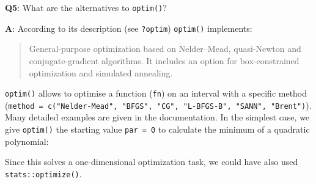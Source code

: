 \documentclass[
]{krantz}
\makeatletter
\newenvironment{Shaded}{\begin{snugshade}}{\end{snugshade}}
\newcommand{\CommentTok}[1]{\textcolor[rgb]{0.56,0.35,0.01}{\textit{#1}}}
\newcommand{\ControlFlowTok}[1]{\textcolor[rgb]{0.13,0.29,0.53}{\textbf{#1}}}
\newcommand{\DataTypeTok}[1]{\textcolor[rgb]{0.13,0.29,0.53}{#1}}
\newcommand{\DecValTok}[1]{\textcolor[rgb]{0.00,0.00,0.81}{#1}}
\newcommand{\FloatTok}[1]{\textcolor[rgb]{0.00,0.00,0.81}{#1}}
\newcommand{\KeywordTok}[1]{\textcolor[rgb]{0.13,0.29,0.53}{\textbf{#1}}}
\newcommand{\NormalTok}[1]{#1}
\newcommand{\OperatorTok}[1]{\textcolor[rgb]{0.81,0.36,0.00}{\textbf{#1}}}
\newcommand{\StringTok}[1]{\textcolor[rgb]{0.31,0.60,0.02}{#1}}
\newenvironment{kframe}{%
\medskip{}
\setlength{\fboxsep}{.8em}
 \def\at@end@of@kframe{}%
 \ifinner\ifhmode%
  \def\at@end@of@kframe{\end{minipage}}%
  \begin{minipage}{\columnwidth}%
 \fi\fi%
 \def\FrameCommand##1{\hskip\@totalleftmargin \hskip-\fboxsep
 \colorbox{shadecolor}{##1}\hskip-\fboxsep
     \hskip-\linewidth \hskip-\@totalleftmargin \hskip\columnwidth}%
 \MakeFramed {\advance\hsize-\width
   \@totalleftmargin\z@ \linewidth\hsize
   \@setminipage}}%
 {\par\unskip\endMakeFramed%
 \at@end@of@kframe}
\renewenvironment{Shaded}{\begin{kframe}}{\end{kframe}}
\renewcommand{\KeywordTok} [1]{\textcolor[rgb]{0.00,0.44,0.13}{{#1}}}
\renewcommand{\DataTypeTok}[1]{\textcolor[rgb]{0.56,0.13,0.00}{{#1}}}
\renewcommand{\DecValTok}  [1]{\textcolor[rgb]{0.25,0.63,0.44}{{#1}}}
\renewcommand{\FloatTok}   [1]{\textcolor[rgb]{0.25,0.63,0.44}{{#1}}}
\renewcommand{\StringTok}  [1]{\textcolor[rgb]{0.25,0.44,0.63}{{#1}}}
\renewcommand{\CommentTok} [1]{\textcolor[rgb]{0.38,0.63,0.69}{{#1}}}
\renewcommand{\NormalTok}  [1]{{#1}}
\makeatother
\begin{document}
\textbf{{Q5}}: What are the alternatives to \texttt{optim()}?

\textbf{{A}}: According to its description (see \texttt{?optim}) \texttt{optim()} implements:

\begin{quote}
General-purpose optimization based on Nelder--Mead, quasi-Newton and conjugate-gradient algorithms. It includes an option for box-constrained optimization and simulated annealing.
\end{quote}

\texttt{optim()} allows to optimise a function (\texttt{fn}) on an interval with a specific method (\texttt{method\ =\ c("Nelder-Mead",\ "BFGS",\ "CG",\ "L-BFGS-B",\ "SANN",\ "Brent")}). Many detailed examples are given in the documentation. In the simplest case, we give \texttt{optim()} the starting value \texttt{par\ =\ 0} to calculate the minimum of a quadratic polynomial:

\begin{Shaded}
\end{Shaded}

Since this solves a one-dimensional optimization task, we could have also used \texttt{stats::optimize()}.

\begin{Shaded}
\end{Shaded}
\end{document}
